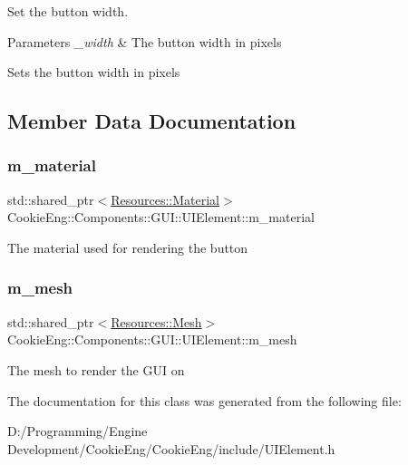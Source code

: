 Set the button width. 


\begin{DoxyParams}{Parameters}
{\em \+\_\+width} & The button width in pixels\\
\hline
\end{DoxyParams}
Sets the button width in pixels 

\subsection{Member Data Documentation}
\mbox{\label{class_cookie_eng_1_1_components_1_1_g_u_i_1_1_u_i_element_a954e279d79501fe6837c3f68c4acfcc0}} 
\subsubsection{\texorpdfstring{m\+\_\+material}{m\_material}}
{\footnotesize\ttfamily std\+::shared\+\_\+ptr$<$\hyperlink{class_cookie_eng_1_1_resources_1_1_material}{Resources\+::\+Material}$>$ Cookie\+Eng\+::\+Components\+::\+G\+U\+I\+::\+U\+I\+Element\+::m\+\_\+material\hspace{0.3cm}{\ttfamily [protected]}}

The material used for rendering the button \mbox{\label{class_cookie_eng_1_1_components_1_1_g_u_i_1_1_u_i_element_ad6a0a678d69f7fc94de86d4a98af915c}} 
\subsubsection{\texorpdfstring{m\+\_\+mesh}{m\_mesh}}
{\footnotesize\ttfamily std\+::shared\+\_\+ptr$<$\hyperlink{struct_cookie_eng_1_1_resources_1_1_mesh}{Resources\+::\+Mesh}$>$ Cookie\+Eng\+::\+Components\+::\+G\+U\+I\+::\+U\+I\+Element\+::m\+\_\+mesh\hspace{0.3cm}{\ttfamily [protected]}}

The mesh to render the G\+UI on 

The documentation for this class was generated from the following file\+:\begin{DoxyCompactItemize}
\item 
D\+:/\+Programming/\+Engine Development/\+Cookie\+Eng/\+Cookie\+Eng/include/U\+I\+Element.\+h\end{DoxyCompactItemize}
